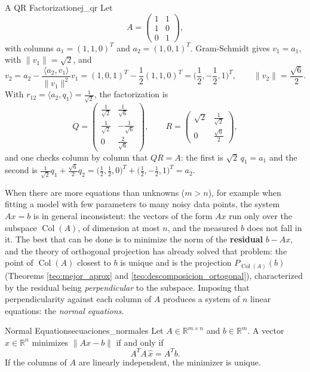 \documentclass[11pt, a4paper]{article}
\begin{document}
\begin{ejemplo}{A QR Factorization}{ej_qr}
Let
\[
A = \begin{pmatrix} 1 & 1 \\ 1 & 0 \\ 0 & 1 \end{pmatrix},
\]
with columns $a_1 = (1,1,0)^T$ and $a_2 = (1,0,1)^T$. Gram-Schmidt gives $v_1 = a_1$, with $\|v_1\| = \sqrt{2}$, and
\[
v_2 = a_2 - \frac{\langle a_2, v_1 \rangle}{\|v_1\|^2} v_1 = (1,0,1)^T - \frac{1}{2}(1,1,0)^T = \Big( \frac{1}{2}, -\frac{1}{2}, 1 \Big)^T,
\qquad \|v_2\| = \frac{\sqrt{6}}{2}.
\]
With $r_{12} = \langle a_2, q_1 \rangle = \frac{1}{\sqrt{2}}$, the factorization is
\[
Q = \begin{pmatrix} \frac{1}{\sqrt{2}} & \frac{1}{\sqrt{6}} \\ \frac{1}{\sqrt{2}} & -\frac{1}{\sqrt{6}} \\ 0 & \frac{2}{\sqrt{6}} \end{pmatrix}, \qquad
R = \begin{pmatrix} \sqrt{2} & \frac{1}{\sqrt{2}} \\ 0 & \frac{\sqrt{6}}{2} \end{pmatrix},
\]
and one checks column by column that $QR = A$: the first is $\sqrt{2} \, q_1 = a_1$ and the second is $\frac{1}{\sqrt{2}} q_1 + \frac{\sqrt{6}}{2} q_2 = \big( \frac{1}{2}, \frac{1}{2}, 0 \big)^T + \big( \frac{1}{2}, -\frac{1}{2}, 1 \big)^T = a_2$.
\end{ejemplo}

When there are more equations than unknowns ($m > n$), for example when fitting a model with few parameters to many noisy data points, the system $Ax = b$ is in general inconsistent: the vectors of the form $Ax$ run only over the subspace $\operatorname{Col}(A)$, of dimension at most $n$, and the measured $b$ does not fall in it. The best that can be done is to minimize the norm of the \textbf{residual} $b - Ax$, and the theory of orthogonal projection has already solved that problem: the point of $\operatorname{Col}(A)$ closest to $b$ is unique and is the projection $P_{\operatorname{Col}(A)}(b)$ (Theorems \ref{teo:mejor_aprox} and \ref{teo:descomposicion_ortogonal}), characterized by the residual being \emph{perpendicular} to the subspace. Imposing that perpendicularity against each column of $A$ produces a system of $n$ linear equations: the \emph{normal equations}.

\begin{teorema}{Normal Equations}{ecuaciones_normales}
Let $A \in \mathbb{R}^{m \times n}$ and $b \in \mathbb{R}^m$. A vector $\hat{x} \in \mathbb{R}^n$ minimizes $\|Ax - b\|$ if and only if
\[
A^T A \, \hat{x} = A^T b.
\]
If the columns of $A$ are linearly independent, the minimizer is unique.
\end{teorema}
\end{document}
